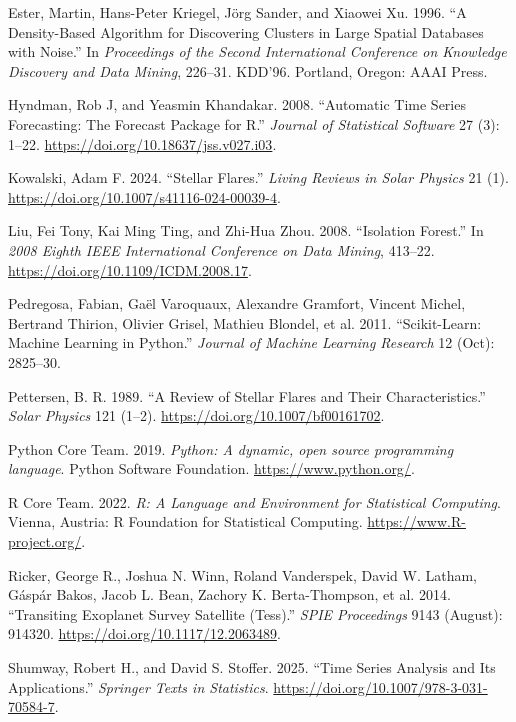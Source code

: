 \documentclass[
]{article}
\newlength{\cslhangindent}
\newenvironment{CSLReferences}[2] %
 {\begin{list}{}{%
  \setlength{\itemindent}{0pt}
  \setlength{\leftmargin}{0pt}
  \setlength{\parsep}{0pt}
  \ifodd #1
   \setlength{\leftmargin}{\cslhangindent}
   \setlength{\itemindent}{-1\cslhangindent}
  \fi
  \setlength{\itemsep}{#2\baselineskip}}}
 {\end{list}}
\begin{document}
\label{refs}
\begin{CSLReferences}{1}{0}
Ester, Martin, Hans-Peter Kriegel, Jörg Sander, and Xiaowei Xu. 1996. {``A Density-Based Algorithm for Discovering Clusters in Large Spatial Databases with Noise.''} In \emph{Proceedings of the Second International Conference on Knowledge Discovery and Data Mining}, 226--31. KDD'96. Portland, Oregon: AAAI Press.

Hyndman, Rob J, and Yeasmin Khandakar. 2008. {``Automatic Time Series Forecasting: The Forecast Package for {R}.''} \emph{Journal of Statistical Software} 27 (3): 1--22. \url{https://doi.org/10.18637/jss.v027.i03}.

Kowalski, Adam F. 2024. {``Stellar Flares.''} \emph{Living Reviews in Solar Physics} 21 (1). \url{https://doi.org/10.1007/s41116-024-00039-4}.

Liu, Fei Tony, Kai Ming Ting, and Zhi-Hua Zhou. 2008. {``Isolation Forest.''} In \emph{2008 Eighth IEEE International Conference on Data Mining}, 413--22. \url{https://doi.org/10.1109/ICDM.2008.17}.

Pedregosa, Fabian, Gaël Varoquaux, Alexandre Gramfort, Vincent Michel, Bertrand Thirion, Olivier Grisel, Mathieu Blondel, et al. 2011. {``Scikit-Learn: Machine Learning in Python.''} \emph{Journal of Machine Learning Research} 12 (Oct): 2825--30.

Pettersen, B. R. 1989. {``A Review of Stellar Flares and Their Characteristics.''} \emph{Solar Physics} 121 (1--2). \url{https://doi.org/10.1007/bf00161702}.

Python Core Team. 2019. \emph{{Python: A dynamic, open source programming language}}. {Python Software Foundation}. \url{https://www.python.org/}.

R Core Team. 2022. \emph{R: A Language and Environment for Statistical Computing}. Vienna, Austria: R Foundation for Statistical Computing. \url{https://www.R-project.org/}.

Ricker, George R., Joshua N. Winn, Roland Vanderspek, David W. Latham, Gáspár Bakos, Jacob L. Bean, Zachory K. Berta-Thompson, et al. 2014. {``Transiting Exoplanet Survey Satellite (Tess).''} \emph{SPIE Proceedings} 9143 (August): 914320. \url{https://doi.org/10.1117/12.2063489}.

Shumway, Robert H., and David S. Stoffer. 2025. {``Time Series Analysis and Its Applications.''} \emph{Springer Texts in Statistics}. \url{https://doi.org/10.1007/978-3-031-70584-7}.

\end{CSLReferences}
\end{document}
